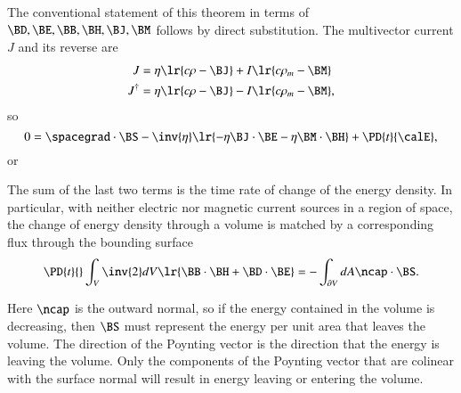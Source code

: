 The conventional statement of this theorem in terms of \( \BD, \BE, \BB, \BH, \BJ, \BM \) follows by direct substitution.
The multivector current \( J \) and its reverse are
\begin{dmath}\label{eqn:poyntingTheorem:160}
\begin{aligned}
J &= \eta \lr{ c \rho - \BJ } + I \lr{ c \rho_m - \BM } \\
J^\dagger &= \eta \lr{ c \rho - \BJ } - I \lr{ c \rho_m - \BM },
\end{aligned}
\end{dmath}
so
\begin{dmath}\label{eqn:poyntingTheorem:180}
0 =
\spacegrad \cdot \BS
-
\inv{\eta}
\lr{
- \eta \BJ \cdot \BE
- \eta \BM \cdot \BH
}
+ \PD{t}{\calE},
\end{dmath}
or

The sum of the last two terms is the time rate of change of the energy density.
In particular,
with neither electric nor magnetic current sources in a region of space,
the change of energy density through a volume is matched by a corresponding flux through the bounding surface
\begin{dmath}\label{eqn:poyntingTheorem:740}
\PD{t}{} \int_V
\inv{2} dV \lr{
\BB \cdot \BH
+ \BD \cdot \BE
}
=
-\int_{\partial V} dA \ncap \cdot \BS.
\end{dmath}

Here \( \ncap \) is the outward normal, so if the energy contained in the volume is decreasing, then \( \BS \) must represent the energy per unit area that leaves the volume.
The direction of the Poynting vector is the direction that the energy is leaving the volume.
Only the components of the Poynting vector that are colinear with the surface normal will result in energy leaving or entering the volume.

